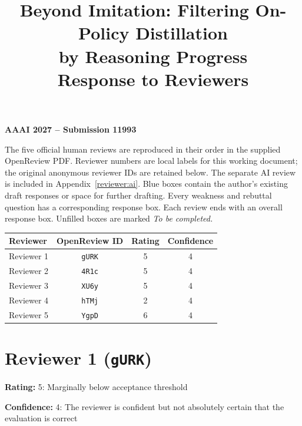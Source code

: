 \documentclass[11pt,a4paper]{article}
\title{\Large Beyond Imitation: Filtering On-Policy Distillation\\
by Reasoning Progress\\[0.65em]
\LARGE Response to Reviewers}
\author{}
\date{}
\begin{document}
\maketitle
\thispagestyle{fancy}

\textbf{AAAI 2027 -- Submission 11993}

The five official human reviews are reproduced in their order in the supplied
OpenReview PDF. Reviewer numbers are local labels for this working document;
the original anonymous reviewer IDs are retained below.
The separate AI review is included in Appendix~\ref{reviewer:ai}.
Blue boxes contain the author's existing draft responses or space for further
drafting. Every weakness and rebuttal question has a corresponding response box.
Each review ends with an overall response box. Unfilled boxes are marked
\textit{To be completed.}

\begin{center}
\begin{tabular}{lccc}
\hline
Reviewer & OpenReview ID & Rating & Confidence \\
\hline
Reviewer 1 & \texttt{gURK} & 5 & 4 \\
Reviewer 2 & \texttt{4R1c} & 5 & 4 \\
Reviewer 3 & \texttt{XU6y} & 5 & 4 \\
Reviewer 4 & \texttt{hTMj} & 2 & 4 \\
Reviewer 5 & \texttt{YgpD} & 6 & 4 \\
\hline
\end{tabular}
\end{center}

\tableofcontents

\clearpage

\section{Reviewer 1 (\texttt{gURK})}
\label{reviewer:1}
\noindent\textbf{Rating:} 5: Marginally below acceptance threshold\par
\noindent\textbf{Confidence:} 4: The reviewer is confident but not absolutely certain that the evaluation is correct
\end{document}
